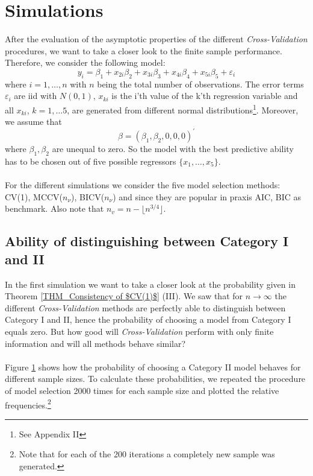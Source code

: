 \documentclass[Research_Module_ES.tex]{subfiles}
\begin{document}
\section{Simulations}
\label{Simulation1}
After the evaluation of the asymptotic properties of the different \textit{Cross-Validation} procedures, we want to take a closer look to the finite sample performance. Therefore, we consider the following model:
\begin{equation}
\label{SimulationModel}
y_i=\beta_1+x_{2i}\beta_2+x_{3i}\beta_3+x_{4i}\beta_4+x_{5i}\beta_5+\varepsilon_i
\end{equation}
where $i=1,\ldots,n$ with $n$ being the total number of observations. The error terms $\varepsilon_i$ are iid with $N(0,1)$,  $x_{ki}$ is the i'th value of the k'th regression variable and all $x_{ki}$, $k=1,\ldots5$, are generated from different normal distributions\footnote{See Appendix II}. Moreover, we assume that
\[
	\beta=(\beta_1,\beta_2,0,0,0)^\prime
\]
where $\beta_1,\beta_2$ are unequal to zero. So the model with the best predictive ability has to be chosen out of five possible regressors $\{x_1,\ldots,x_5\}$. \\
\\
For the different simulations we consider the five model selection methods: CV(1), MCCV($n_\nu$), BICV($n_\nu$) and since they are popular in praxis AIC, BIC as benchmark. Also note that $n_v=n-\lfloor n^{3/4}\rfloor$.

\subsection{Ability of distinguishing between Category I and II }
In the first simulation we want to take a closer look at the probability given in Theorem \ref{THM_Consistency of $CV(1)$} (III). We saw that for $n\to\infty$ the different \textit{Cross-Validation} methods are perfectly able to distinguish between Category I and II, hence the probability of choosing a model from Category I equals zero. But how good will \textit{Cross-Validation} perform with only finite information and will all methods behave similar?\\
\\
Figure \ref{Simulation1} shows how the probability of choosing a Category II model behaves for different sample sizes. To calculate these probabilities, we repeated the procedure of model selection 2000 times for each sample size and plotted the relative frequencies.\footnote{Note that for each of the 200 iterations a completely new sample was generated.}
\end{document}
